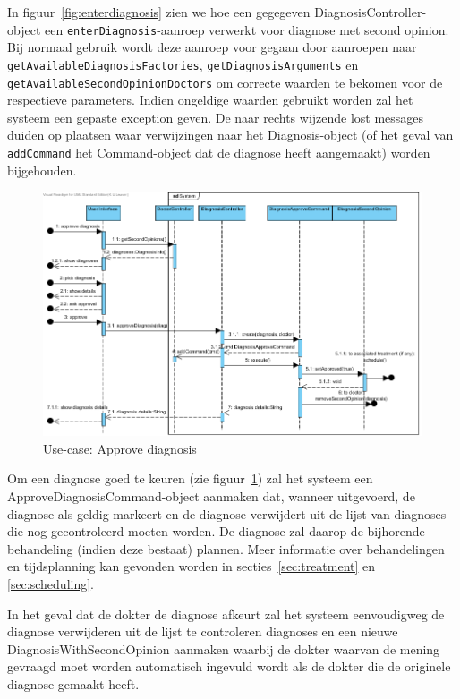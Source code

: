\documentclass[a4paper]{article}
\begin{document}
In figuur~\ref{fig:enterdiagnosis} zien we hoe een gegegeven DiagnosisController-object een \texttt{enterDiagnosis}-aanroep verwerkt voor diagnose met second opinion. Bij normaal gebruik wordt deze aanroep voor gegaan door aanroepen naar \texttt{getAvailableDiagnosisFactories}, \texttt{getDiagnosisArguments} en \texttt{getAvailableSecondOpinionDoctors} om correcte waarden te bekomen voor de respectieve parameters. Indien ongeldige waarden gebruikt worden zal het systeem een gepaste exception geven. De naar rechts wijzende lost messages duiden op plaatsen waar verwijzingen naar het Diagnosis-object (of het geval van \texttt{addCommand} het Command-object dat de diagnose heeft aangemaakt) worden bijgehouden.
\begin{figure}[h]
\centering
\includegraphics[width=\textwidth]{Pictures/ApproveDiagnosis}
\caption{Use-case: Approve diagnosis}
\label{fig:approvediagnosis}
\end{figure}
Om een diagnose goed te keuren (zie figuur~\ref{fig:approvediagnosis}) zal het systeem een ApproveDiagnosisCommand-object aanmaken dat, wanneer uitgevoerd, de diagnose als geldig markeert en de diagnose verwijdert uit de lijst van diagnoses die nog gecontroleerd moeten worden. De diagnose zal daarop de bijhorende behandeling (indien deze bestaat) plannen. Meer informatie over behandelingen en tijdsplanning kan gevonden worden in secties~\ref{sec:treatment} en \ref{sec:scheduling}.

In het geval dat de dokter de diagnose afkeurt zal het systeem eenvoudigweg de diagnose verwijderen uit de lijst te controleren diagnoses en een nieuwe DiagnosisWithSecondOpinion aanmaken waarbij de dokter waarvan de mening gevraagd moet worden automatisch ingevuld wordt als de dokter die de originele diagnose gemaakt heeft.
\end{document}
